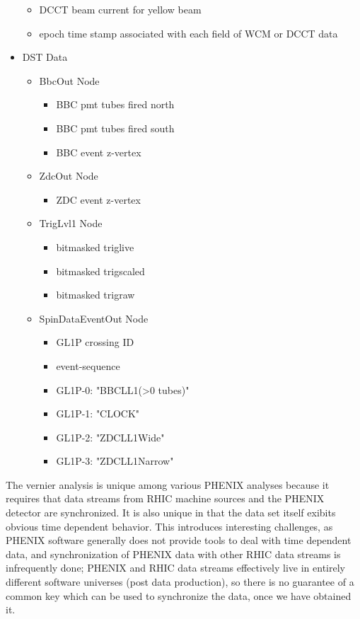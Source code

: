 \begin{itemize}
\begin{itemize}
  \item DCCT beam current for yellow beam
  \item epoch time stamp associated with each field of WCM or DCCT data
  \end{itemize}
\item DST Data
  \begin{itemize}
  \item BbcOut Node
    \begin{itemize}
      \item BBC pmt tubes fired north
      \item BBC pmt tubes fired south
      \item BBC event z-vertex
    \end{itemize}
  \end{itemize}
  \begin{itemize}
  \item ZdcOut Node
    \begin{itemize}
      \item ZDC event z-vertex
    \end{itemize}
  \end{itemize}
  \begin{itemize}
  \item TrigLvl1 Node
    \begin{itemize}
      \item bitmasked triglive
      \item bitmasked trigscaled
      \item bitmasked trigraw
    \end{itemize}
  \end{itemize}  
  \begin{itemize}
  \item SpinDataEventOut Node
    \begin{itemize}
      \item GL1P crossing ID
      \item event-sequence
      \item GL1P-0: "BBCLL1(\textgreater0 tubes)"
      \item GL1P-1: "CLOCK"
      \item GL1P-2: "ZDCLL1Wide"
      \item GL1P-3: "ZDCLL1Narrow"
    \end{itemize}
  \end{itemize}  
\end{itemize}

The vernier analysis is unique among various PHENIX analyses because it requires
that data streams from RHIC machine sources and the PHENIX detector are
synchronized. It is also unique in that the data set itself exibits obvious time
dependent behavior. This introduces interesting challenges, as PHENIX software
generally does not provide tools to deal with time dependent data, and
synchronization of PHENIX data with other RHIC data streams is infrequently
done; PHENIX and RHIC data streams effectively live in entirely different
software universes (post data production), so there is no guarantee of a common
key which can be used to synchronize the data, once we have obtained it. 

